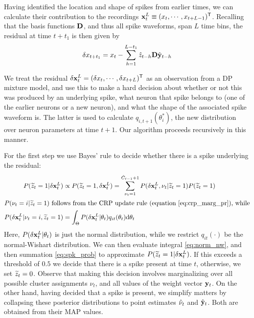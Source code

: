 Having identified the location and shape of spikes from earlier times, we can calculate their contribution to the recordings 
$\mathbf{x}^L_t \equiv (x_{t},\cdots, x_{t+L-1})^{\mathsf{T}}$.
Recalling that the basis functions $\mathbf{D}$, and thus all spike waveforms, span $L$ time bins, the residual at time $t+t_1$ is then given by
\begin{align}
  \delta x_{t+t_1} = x_t - \sum_{h=1}^{L-t_1} \hat{z}_{t-h} \mathbf{D}\hat{\mathbf{y}}_{t-h} \label{eq:resid}
\end{align}

We treat the residual $\delta{\mathbf{x}}^L_{t} =  (\delta x_{t}, \cdots, \delta x_{t+L})^{\mathsf{T}}$ as an observation from a DP mixture model, and use this to make a hard decision about whether or not this was produced 
by an underlying spike, what neuron that spike belongs 
to (one of the earlier neurons or a new neuron), and what the shape of the associated spike waveform is. The latter is used to calculate
$q_{i,t+1}(\theta^*_i)$, the new distribution over neuron parameters at time $t+1$. Our algorithm proceeds recursively in this manner. 


For the first step we use Bayes' rule to decide whether there is a spike underlying the residual:
\begin{align}
  P(\widetilde{z}_t = 1 | \delta{\mathbf{x}}^L_t)  &\propto P(\widetilde{z}_t = 1,  \delta{\mathbf{x}}^L_t) = \sum_{\nu_t = 1}^{\hat{C}_{t-1}+1} P(\delta{\mathbf{x}}^L_t, {\nu_t} | \widetilde{z}_t = 1) P(\widetilde{z}_t = 1) \label{eq:spk_prob}\\
\intertext{$P({\nu_t} = i | \widetilde{z}_t = 1)$ follows from the CRP update rule (equation \eqref{eq:crp_marg_pr}), while}
  P(\delta{\mathbf{x}}^L_t | {\nu_t = i} , \widetilde{z}_t = 1) &= \int_{\Theta} P(\delta{\mathbf{x}}^L_t | \theta_t) q_{it} (\theta_t) \mathrm{d} \theta_t  \label{eq:norm_nw}
\end{align}
Here,  $P(\delta{\mathbf{x}}^L_t | \theta_t)$ is just the normal distribution, while we restrict $q_{it}(\cdot)$ be the 
normal-Wishart distribution. %
We can then evaluate integral \eqref{eq:norm_nw}, and then summation \eqref{eq:spk_prob} to approximate $P(\widetilde{z}_t = 1 | \delta{\mathbf{x}}^L_t)$. 
If this exceeds a threshold of $0.5$ we decide that there is a spike present at time $t$, otherwise, we set $\widetilde{z}_t = 0$.
Observe that making this decision involves marginalizing over all possible cluster assignments $\nu_t$, and all values of the weight vector $\mathbf{y}_t$.
On the other hand, having decided that a spike is present, we simplify matters by collapsing these posterior distributions to point estimates 
$\hat{\nu}_t$ and $\hat{\mathbf{y}}_t$. Both are obtained from their MAP values. 

